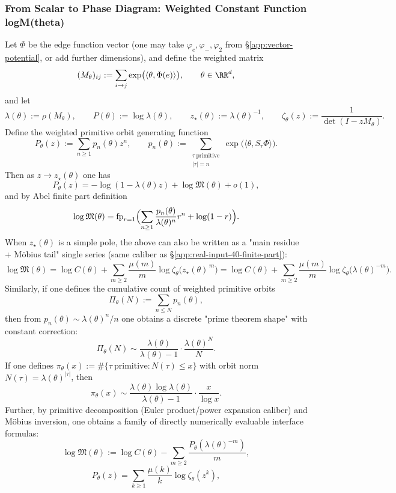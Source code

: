 \subsubsection{From Scalar to Phase Diagram: Weighted Constant Function logM(theta)}\label{app:real-input-40-logm-theta}
Let $\Phi$ be the edge function vector (one may take $\varphi_e,\varphi_-,\varphi_2$ from \S\ref{app:vector-potential}, or add further dimensions),
and define the weighted matrix
\[
(M_\theta)_{ij}:=\sum_{i\to j}\exp\bigl(\langle\theta,\Phi(e)\rangle\bigr),\qquad \theta\in\RR^d,
\]
and let
\[
\lambda(\theta):=\rho(M_\theta),\qquad P(\theta):=\log\lambda(\theta),\qquad z_\star(\theta):=\lambda(\theta)^{-1},
\qquad
\zeta_\theta(z):=\frac{1}{\det(I-zM_\theta)}.
\]
Define the weighted primitive orbit generating function
\[
P_\theta(z):=\sum_{n\ge 1}p_n(\theta)z^n,\qquad
p_n(\theta):=\sum_{\substack{\tau\ \mathrm{primitive}\\|\tau|=n}}\exp\bigl(\langle\theta,S_\tau\Phi\rangle\bigr).
\]
Then as $z\to z_\star(\theta)$ one has
\[
P_\theta(z)=-\log(1-\lambda(\theta)z)+\log\mathfrak{M}(\theta)+o(1),
\]
and by Abel finite part definition
\[
\log\mathfrak{M}(\theta)=\mathrm{fp}_{r=1}\Bigl(\sum_{n\ge 1}\frac{p_n(\theta)}{\lambda(\theta)^n}r^n+\log(1-r)\Bigr).
\]
When $z_\star(\theta)$ is a simple pole, the above can also be written as a "main residue + Möbius tail" single series (same caliber as \S\ref{app:real-input-40-finite-part}):
\[
\log\mathfrak{M}(\theta)
=\log C(\theta)+\sum_{m\ge 2}\frac{\mu(m)}{m}\log\zeta_\theta\bigl(z_\star(\theta)^{\,m}\bigr)
=\log C(\theta)+\sum_{m\ge 2}\frac{\mu(m)}{m}\log\zeta_\theta\bigl(\lambda(\theta)^{-m}\bigr).
\]
Similarly, if one defines the cumulative count of weighted primitive orbits
\[
\Pi_\theta(N):=\sum_{n\le N}p_n(\theta),
\]
then from $p_n(\theta)\sim \lambda(\theta)^n/n$ one obtains a discrete "prime theorem shape" with constant correction:
\[
\Pi_\theta(N)\sim \frac{\lambda(\theta)}{\lambda(\theta)-1}\cdot\frac{\lambda(\theta)^N}{N}.
\]
If one defines $\pi_\theta(x):=\#\{\tau\ \mathrm{primitive}:N(\tau)\le x\}$ with orbit norm $N(\tau)=\lambda(\theta)^{|\tau|}$, then
\[
\pi_\theta(x)\sim \frac{\lambda(\theta)\log\lambda(\theta)}{\lambda(\theta)-1}\cdot\frac{x}{\log x}.
\]
Further, by primitive decomposition (Euler product/power expansion caliber) and Möbius inversion, one obtains a family of directly numerically evaluable interface formulas:
\[
\log\mathfrak{M}(\theta)
:=\log C(\theta)-\sum_{m\ge 2}\frac{P_\theta(\lambda(\theta)^{-m})}{m},
\]
\[
P_\theta(z)=\sum_{k\ge 1}\frac{\mu(k)}{k}\log\zeta_\theta(z^k),
\]
